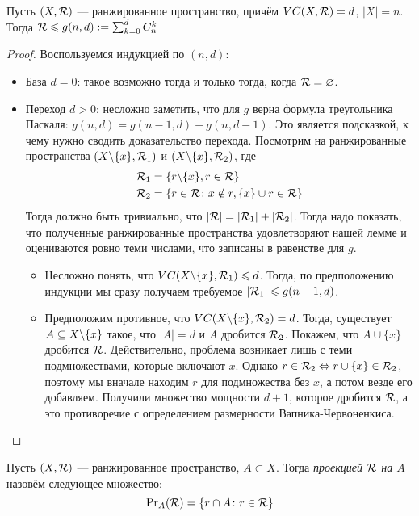 \begin{lemma}
	Пусть $(X, \mathcal{R})$ --- ранжированное пространство, причём $VC(X, \mathcal{R}) = d$, $|X| = n$. Тогда $\mathcal{R} \leqslant g(n, d) := \sum_{k = 0}^d C_n^k$
\end{lemma}

\begin{proof}
	Воспользуемся индукцией по $(n, d)$:
	\begin{itemize}
		\item База $d = 0$: такое возможно тогда и только тогда, когда $\mathcal{R} = \varnothing$.
		
		\item Переход $d > 0$: несложно заметить, что для $g$ верна формула треугольника Паскаля: \(g(n, d) = g(n - 1, d) + g(n, d - 1)\). Это является подсказкой, к чему нужно сводить доказательство перехода. Посмотрим на ранжированные пространства $(X \backslash \{x\}, \mathcal{R}_1)$ и $(X \backslash \{x\}, \mathcal{R}_2)$, где
		\begin{align*}
			&{\mathcal{R}_1 = \{r \backslash \{x\}, r \in \mathcal{R}\}}
			\\
			&{\mathcal{R}_2 = \{r \in \mathcal{R} \colon x \notin r, \{x\} \cup r \in \mathcal{R}\}}
		\end{align*}
		Тогда должно быть тривиально, что $|\mathcal{R}| = |\mathcal{R}_1| + |\mathcal{R}_2|$. Тогда надо показать, что полученные ранжированные пространства удовлетворяют нашей лемме и оцениваются ровно теми числами, что записаны в равенстве для $g$.
		\begin{itemize}
			\item Несложно понять, что $VC(X \backslash \{x\}, \mathcal{R}_1) \leqslant d$. Тогда, по предположению индукции мы сразу получаем требуемое $|\mathcal{R}_1| \leqslant g(n - 1, d)$.
			
			\item Предположим противное, что $VC(X \backslash \{x\}, \mathcal{R}_2) = d$. Тогда, существует $A \subseteq X \backslash \{x\}$ такое, что $|A| = d$ и $A$ дробится $\mathcal{R}_2$. Покажем, что $A \cup \{x\}$ дробится $\mathcal{R}$. Действительно, проблема возникает лишь с теми подмножествами, которые включают $x$. Однако $r \in \mathcal{R}_2 \Leftrightarrow r \cup \{x\} \in \mathcal{R}_2$, поэтому мы вначале находим $r$ для подмножества без $x$, а потом везде его добавляем. Получили множество мощности $d + 1$, которое дробится $\mathcal{R}$, а это противоречие с определением размерности Вапника-Червоненкиса.
		\end{itemize}
	\end{itemize}
\end{proof}

\begin{definition}
	Пусть $(X, \mathcal{R})$ --- ранжированное пространство, $A \subset X$. Тогда \textit{проекцией $\mathcal{R}$ на $A$} назовём следующее множество:
	\[
		\operatorname{Pr}_A(\mathcal{R}) = \{r \cap A \colon r \in \mathcal{R}\}
	\]
\end{definition}

